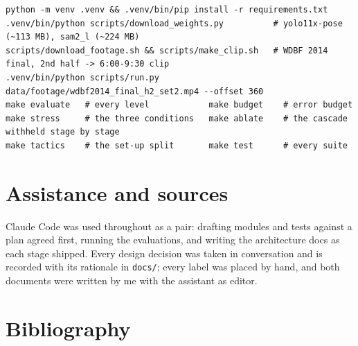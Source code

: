 \documentclass[10pt,a4paper]{article}
\begin{document}
{\footnotesize
\begin{verbatim}
python -m venv .venv && .venv/bin/pip install -r requirements.txt
.venv/bin/python scripts/download_weights.py          # yolo11x-pose (~113 MB), sam2_l (~224 MB)
scripts/download_footage.sh && scripts/make_clip.sh   # WDBF 2014 final, 2nd half -> 6:00-9:30 clip
.venv/bin/python scripts/run.py data/footage/wdbf2014_final_h2_set2.mp4 --offset 360
make evaluate   # every level            make budget    # error budget
make stress     # the three conditions   make ablate    # the cascade withheld stage by stage
make tactics    # the set-up split       make test      # every suite
\end{verbatim}}

\section{Assistance and sources}
\label{sec:sources}

Claude Code was used throughout as a pair: drafting modules and tests against a plan
agreed first, running the evaluations, and writing the architecture docs as each stage
shipped. Every design decision was taken in conversation and is recorded with its
rationale in \texttt{docs/}; every label was placed by hand, and both documents were written
by me with the assistant as editor.

\section*{Bibliography}
\end{document}
